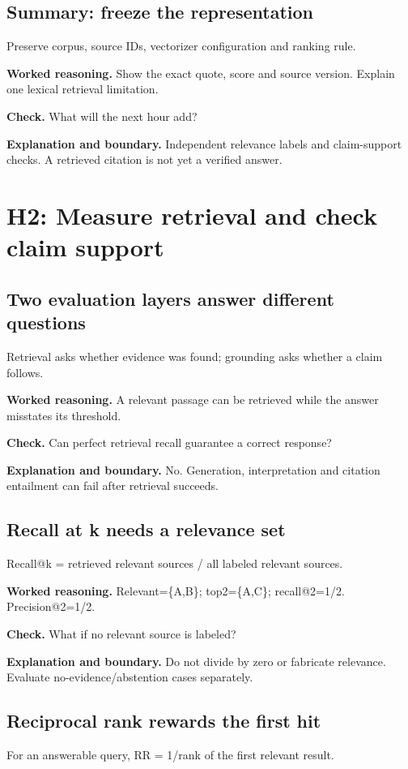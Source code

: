 \subsection{Summary: freeze the representation}
Preserve corpus, source IDs, vectorizer configuration and ranking rule.

\textbf{Worked reasoning.} Show the exact quote, score and source version. Explain one lexical retrieval limitation.

\textbf{Check.} What will the next hour add?

\textbf{Explanation and boundary.} Independent relevance labels and claim-support checks. A retrieved citation is not yet a verified answer.

\section{H2: Measure retrieval and check claim support}
\subsection{Two evaluation layers answer different questions}
Retrieval asks whether evidence was found; grounding asks whether a claim follows.

\textbf{Worked reasoning.} A relevant passage can be retrieved while the answer misstates its threshold.

\textbf{Check.} Can perfect retrieval recall guarantee a correct response?

\textbf{Explanation and boundary.} No. Generation, interpretation and citation entailment can fail after retrieval succeeds.

\subsection{Recall at k needs a relevance set}
Recall@k = retrieved relevant sources / all labeled relevant sources.

\textbf{Worked reasoning.} Relevant=\{A,B\}; top2=\{A,C\}; recall@2=1/2. Precision@2=1/2.

\textbf{Check.} What if no relevant source is labeled?

\textbf{Explanation and boundary.} Do not divide by zero or fabricate relevance. Evaluate no-evidence/abstention cases separately.

\subsection{Reciprocal rank rewards the first hit}
For an answerable query, RR = 1/rank of the first relevant result.

